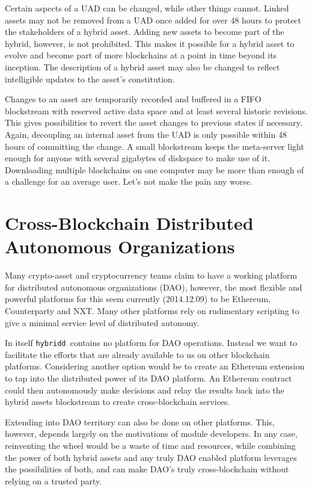 \documentclass[a4paper,fullpack]{article}
\newcommand{\hybridd}{\texttt{hybridd}\, }
\begin{document}
Certain aspects of a UAD can be changed, while other things cannot. Linked assets may not be removed from a UAD once added for over 48 hours to protect the stakeholders of a hybrid asset. Adding new assets to become part of the hybrid, however, is not prohibited. This makes it possible for a hybrid asset to evolve and become part of more blockchains at a point in time beyond its inception. The description of a hybrid asset may also be changed to reflect intelligible updates to the asset's constitution.

Changes to an asset are temporarily recorded and buffered in a FIFO blockstream with reserved active data space and at least several historic revisions. This gives possibilities to revert the asset changes to previous states if necessary. Again, decoupling an internal asset from the UAD is only possible within 48 hours of committing the change. A small blockstream keeps the meta-server light enough for anyone with several gigabytes of diskspace to make use of it. Downloading multiple blockchains on one computer may be more than enough of a challenge for an average user. Let's not make the pain any worse.


\section{Cross-Blockchain Distributed Autonomous Organizations}

Many crypto-asset and cryptocurrency teams claim to have a working platform for distributed autonomous organizations (DAO), however, the most flexible and powerful platforms for this seem currently (2014.12.09) to be Ethereum, Counterparty and NXT. Many other platforms rely on rudimentary scripting to give a minimal service level of distributed autonomy.

In itself \hybridd contains no platform for DAO operations. Instead we want to facilitate the efforts that are already available to us on other blockchain platforms. Considering another option would be to create an Ethereum extension to tap into the distributed power of its DAO platform. An Ethereum contract could then autonomously make decisions and relay the results back into the hybrid assets blockstream to create cross-blockchain services.

Extending into DAO territory can also be done on other platforms. This, however, depends largely on the motivations of module developers. In any case, reinventing the wheel would be a waste of time and resources, while combining the power of both hybrid assets and any truly DAO enabled platform leverages the possibilities of both, and can make DAO's truly cross-blockchain without relying on a trusted party.
\end{document}
